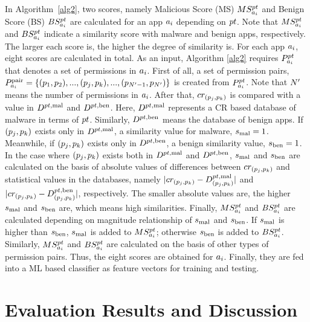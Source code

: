 \documentclass{ieeeaccess}
\begin{document}
In Algorithm~\ref{alg2}, two scores, namely Malicious Score (MS) $MS^{pt}_{a_{i}}$ and Benign Score (BS) $BS^{pt}_{a_{i}}$ are calculated for an app $a_{i}$ depending on $pt$.
Note that $MS^{pt}_{a_{i}}$ and $BS^{pt}_{a_{i}}$ indicate a similarity score with malware and benign apps, respectively.  
The larger each score is, the higher the degree of similarity is. 
For each app $a_{i}$, eight scores are calculated in total.
As an input, Algorithm \ref{alg2} requires $P^{pt}_{a_{i}}$ that denotes a set of permissions in $a_{i}$.
First of all, a set of permission pairs, $P^{\mathrm{pair}}_{a_{i}} = \{(p_1, p_2), ..., (p_j, p_k), ..., (p_{N'-1}, p_{N'})\}$ is created from $P^{pt}_{a_{i}}$.
Note that $N'$ means the number of permissions in $a_{i}$.
After that, $cr_{(p_j, p_k)}$ is compared with a value in $D^{pt, \mathrm{mal}}$ and $D^{pt, \mathrm{ben}}$.
Here, $D^{pt, \mathrm{mal}}$ represents a CR based database of malware in terms of $pt$.
Similarly, $D^{pt, \mathrm{ben}}$ means the database of benign apps.
If $(p_j, p_k)$ exists only in $D^{pt, \mathrm{mal}}$, a similarity value for malware, $s_{\mathrm{mal}}=1$.
Meanwhile, if $(p_j, p_k)$ exists only in $D^{pt, \mathrm{ben}}$, a benign similarity value, $s_{\mathrm{ben}}=1$.
In the case where $(p_j, p_k)$ exists both in $D^{pt, \mathrm{mal}}$ and $D^{pt, \mathrm{ben}}$, $s_{\mathrm{mal}}$ and $s_{\mathrm{ben}}$ are calculated on the basis of absolute values of differences between $cr_{(p_j, p_k)}$ and statistical values in the databases, namely $|cr_{(p_j, p_k)} - D^{pt, \mathrm{mal}}_{(p_j, p_k)}|$ and $|cr_{(p_j, p_k)} - D^{pt, \mathrm{ben}}_{(p_j, p_k)}|$, respectively.
The smaller absolute values are, the higher $s_{\mathrm{mal}}$ and $s_{\mathrm{ben}}$ are, which means high similarities.
Finally, $MS^{pt}_{a_{i}}$ and $BS^{pt}_{a_{i}}$ are calculated depending on magnitude relationship of $s_{\mathrm{mal}}$ and $s_{\mathrm{ben}}$.
If $s_{\mathrm{mal}}$ is higher than $s_{\mathrm{ben}}$, $s_{\mathrm{mal}}$ is added to $MS^{pt}_{a_{i}}$; otherwise $s_{\mathrm{ben}}$ is added to $BS^{pt}_{a_{i}}$.  
Similarly, $MS^{pt}_{a_{i}}$ and $BS^{pt}_{a_{i}}$ are calculated on the basis of other types of permission pairs.
Thus, the eight scores are obtained for $a_{i}$.
Finally, they are fed into a ML based classifier as feature vectors for training and testing.  

\section{Evaluation Results and Discussion} \label{sec:simulation}
\end{document}
